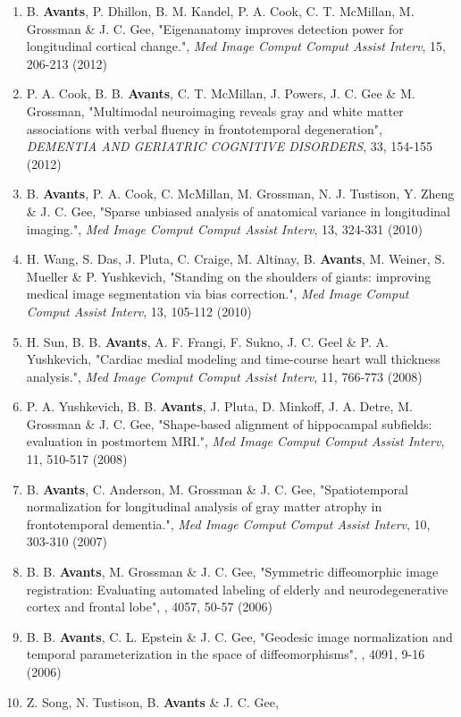 \documentclass[11pt]{moderncv} %
\begin{document}
\begin{enumerate}
\item B. \textbf{Avants}, P. Dhillon, B. M. Kandel, P. A. Cook, C. T. McMillan, M. Grossman \&  J. C. Gee,
"Eigenanatomy improves detection power for longitudinal cortical change.",
{\em Med Image Comput Comput Assist Interv}, 15, 206-213 (2012)
\item P. A. Cook, B. B. \textbf{Avants}, C. T. McMillan, J. Powers, J. C. Gee \&  M. Grossman,
"Multimodal neuroimaging reveals gray and white matter associations with verbal fluency in frontotemporal degeneration",
{\em DEMENTIA AND GERIATRIC COGNITIVE DISORDERS}, 33, 154-155 (2012)
\item B. \textbf{Avants}, P. A. Cook, C. McMillan, M. Grossman, N. J. Tustison, Y. Zheng \&  J. C. Gee,
"Sparse unbiased analysis of anatomical variance in longitudinal imaging.",
{\em Med Image Comput Comput Assist Interv}, 13, 324-331 (2010)
\item H. Wang, S. Das, J. Pluta, C. Craige, M. Altinay, B. \textbf{Avants}, M. Weiner, S. Mueller \&  P. Yushkevich,
"Standing on the shoulders of giants: improving medical image segmentation via bias correction.",
{\em Med Image Comput Comput Assist Interv}, 13, 105-112 (2010)
\item H. Sun, B. B. \textbf{Avants}, A. F. Frangi, F. Sukno, J. C. Geel \&  P. A. Yushkevich,
"Cardiac medial modeling and time-course heart wall thickness analysis.",
{\em Med Image Comput Comput Assist Interv}, 11, 766-773 (2008)
\item P. A. Yushkevich, B. B. \textbf{Avants}, J. Pluta, D. Minkoff, J. A. Detre, M. Grossman \&  J. C. Gee,
"Shape-based alignment of hippocampal subfields: evaluation in postmortem MRI.",
{\em Med Image Comput Comput Assist Interv}, 11, 510-517 (2008)
\item B. \textbf{Avants}, C. Anderson, M. Grossman \&  J. C. Gee,
"Spatiotemporal normalization for longitudinal analysis of gray matter atrophy in frontotemporal dementia.",
{\em Med Image Comput Comput Assist Interv}, 10, 303-310 (2007)
\item B. B. \textbf{Avants}, M. Grossman \&  J. C. Gee,
"Symmetric diffeomorphic image registration: Evaluating automated labeling of elderly and neurodegenerative cortex and frontal lobe",
, 4057, 50-57 (2006)
\item B. B. \textbf{Avants}, C. L. Epstein \&  J. C. Gee,
"Geodesic image normalization and temporal parameterization in the space of diffeomorphisms",
, 4091, 9-16 (2006)
\item Z. Song, N. Tustison, B. \textbf{Avants} \&  J. C. Gee,

\end{enumerate}
\end{document}
